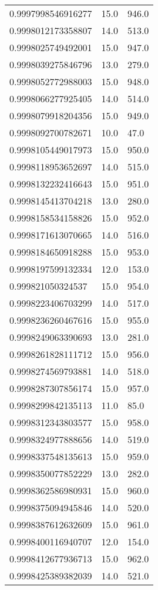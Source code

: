 \begin{center}
\begin{supertabular}[H]{p{0.30\textwidth}p{0.05\textwidth}p{0.05\textwidth}}
0.9997998546916277 & 15.0 & 946.0 \\ 
0.9998012173358807 & 14.0 & 513.0 \\ 
0.9998025749492001 & 15.0 & 947.0 \\ 
0.9998039275846796 & 13.0 & 279.0 \\ 
0.9998052772988003 & 15.0 & 948.0 \\ 
0.9998066277925405 & 14.0 & 514.0 \\ 
0.9998079918204356 & 15.0 & 949.0 \\ 
0.9998092700782671 & 10.0 & 47.0 \\ 
0.9998105449017973 & 15.0 & 950.0 \\ 
0.9998118953652697 & 14.0 & 515.0 \\ 
0.9998132232416643 & 15.0 & 951.0 \\ 
0.9998145413704218 & 13.0 & 280.0 \\ 
0.9998158534158826 & 15.0 & 952.0 \\ 
0.9998171613070665 & 14.0 & 516.0 \\ 
0.9998184650918288 & 15.0 & 953.0 \\ 
0.9998197599132334 & 12.0 & 153.0 \\ 
0.999821050324537 & 15.0 & 954.0 \\ 
0.9998223406703299 & 14.0 & 517.0 \\ 
0.9998236260467616 & 15.0 & 955.0 \\ 
0.9998249063390693 & 13.0 & 281.0 \\ 
0.9998261828111712 & 15.0 & 956.0 \\ 
0.9998274569793881 & 14.0 & 518.0 \\ 
0.9998287307856174 & 15.0 & 957.0 \\ 
0.9998299842135113 & 11.0 & 85.0 \\ 
0.9998312343803577 & 15.0 & 958.0 \\ 
0.9998324977888656 & 14.0 & 519.0 \\ 
0.9998337548135613 & 15.0 & 959.0 \\ 
0.9998350077852229 & 13.0 & 282.0 \\ 
0.9998362586980931 & 15.0 & 960.0 \\ 
0.9998375094945846 & 14.0 & 520.0 \\ 
0.9998387612632609 & 15.0 & 961.0 \\ 
0.9998400116940707 & 12.0 & 154.0 \\ 
0.9998412677936713 & 15.0 & 962.0 \\ 
0.9998425389382039 & 14.0 & 521.0 \\ 

\end{supertabular}
\end{center}
